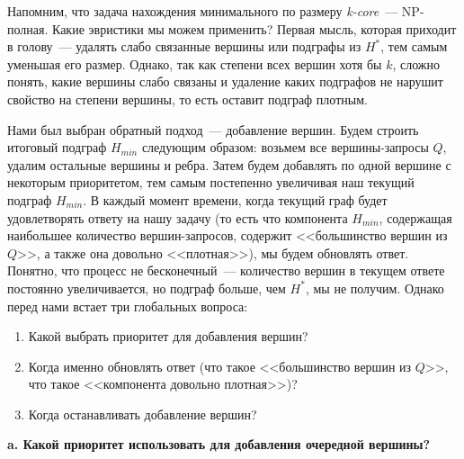 Напомним, что задача нахождения минимального по размеру \textit{k-core}~--- NP-полная. Какие эвристики мы можем применить? Первая мысль, которая приходит в голову~--- удалять слабо связанные вершины или подграфы из $H^*$, тем самым уменьшая его размер. Однако, так как степени всех вершин хотя бы $k$, сложно понять, какие вершины слабо связаны и удаление каких подграфов не нарушит свойство на степени вершины, то есть оставит подграф плотным. 

Нами был выбран обратный подход~--- добавление вершин. Будем строить итоговый подграф $H_{min}$ следующим образом: возьмем все вершины-запросы $Q$, удалим остальные вершины и ребра. Затем будем добавлять по одной вершине с некоторым приоритетом, тем самым постепенно увеличивая наш текущий подграф $H_{min}$. В каждый момент времени, когда текущий граф будет удовлетворять ответу на нашу задачу (то есть что компонента $H_{min}$, содержащая наибольшее количество вершин-запросов, содержит <<большинство вершин из $Q$>>, а также она довольно <<плотная>>), мы будем обновлять ответ. Понятно, что процесс не бесконечный~--- количество вершин в текущем ответе постоянно увеличивается, но подграф больше, чем $H^*$, мы не получим. Однако перед нами встает три глобальных вопроса:

\begin{enumerate}
  \item Какой выбрать приоритет для добавления вершин?
  \item Когда именно обновлять ответ (что такое <<большинство вершин из $Q$>>, что такое <<компонента довольно плотная>>)?
  \item Когда останавливать добавление вершин?
\end{enumerate}

\textbf{a. Какой приоритет использовать для добавления очередной вершины?}

